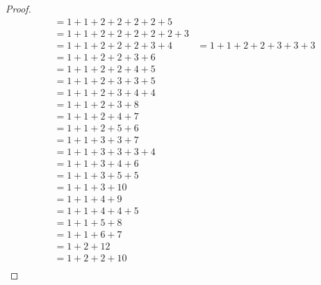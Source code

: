 \begin{proof}
\begin{align*}
           & = 1 + 1 + 2 + 2 + 2 + 2 + 5                                           \\
           & = 1 + 1 + 2 + 2 + 2 + 2 + 2 + 3                                       \\
           & = 1 + 1 + 2 + 2 + 2 + 3 + 4
           & = 1 + 1 + 2 + 2 + 3 + 3 + 3                                           \\
           & = 1 + 1 + 2 + 2 + 3 + 6                                               \\
           & = 1 + 1 + 2 + 2 + 4 + 5                                               \\
           & = 1 + 1 + 2 + 3 + 3 + 5                                               \\
           & = 1 + 1 + 2 + 3 + 4 + 4                                               \\
           & = 1 + 1 + 2 + 3 + 8                                                   \\
           & = 1 + 1 + 2 + 4 + 7                                                   \\
           & = 1 + 1 + 2 + 5 + 6                                                   \\
           & = 1 + 1 + 3 + 3 + 7                                                   \\
           & = 1 + 1 + 3 + 3 + 3 + 4                                               \\
           & = 1 + 1 + 3 + 4 + 6                                                   \\
           & = 1 + 1 + 3 + 5 + 5                                                   \\
           & = 1 + 1 + 3 + 10                                                      \\
           & = 1 + 1 + 4 + 9                                                       \\
           & = 1 + 1 + 4 + 4 + 5                                                   \\
           & = 1 + 1 + 5 + 8                                                       \\
           & = 1 + 1 + 6 + 7                                                       \\
           & = 1 + 2 + 12                                                          \\
           & = 1 + 2 + 2 + 10                                                      \\

\end{align*}
\end{proof}
